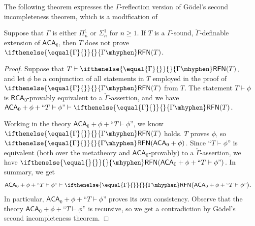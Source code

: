 \documentclass{mhkr}
\newcommand{\added}[1]{#1}
\newcommand{\RFN}[1][]{\ifthenelse{\equal{#1}{}}{}{#1\mhyphen}\mathsf{RFN}}
\newcommand{\RCA}{\mathsf{RCA}}
\newcommand{\ACA}{\mathsf{ACA}}
\begin{document}
\added{
The following theorem expresses the $\Gamma$-reflection version of G\"odel's second incompleteness theorem, which is a modification of \cite[Theorem 2.9]{TowsnerWalsh2024Classification}
\begin{proposition} \label{Proposition: Reflection version of second incompleteness}
    Suppose that $\Gamma$ is either $\Pi^1_n$ or $\Sigma^1_n$ for $n\ge 1$.
    If $T$ is a $\Gamma$-sound, $\check{\Gamma}$-definable extension of $\ACA_0$, then $T$ does not prove $\RFN[\Gamma](T)$.
\end{proposition}
\begin{proof}
    Suppose that $T\vdash \RFN[\Gamma](T)$, and let $\phi$ be a conjunction of all statements in $T$ employed in the proof of $\RFN[\Gamma](T)$ from $T$.
    The statement $T\vdash \phi$ is $\RCA_0$-provably equivalent to a $\check{\Gamma}$-assertion, and we have
    $\ACA_0+\phi+ \text{``} T\vdash \phi\text{''}\vdash \RFN[\Gamma](T)$.

    Working in the theory $\ACA_0 + \phi + \text{``} T\vdash \phi\text{''}$, we know $\RFN[\Gamma](T)$ holds. $T$ proves $\phi$, so $\RFN[\Gamma](\ACA_0+\phi)$. Since ``$T\vdash \phi$'' is equivalent (both over the metatheory and $\ACA_0$-provably) to a $\check{\Gamma}$-assertion, we have $\RFN(\ACA_0 + \phi + \text{``} T\vdash \phi\text{''})$.
    In summary, we get
    \begin{equation*}
        \ACA_0+ \phi + \text{``} T\vdash \phi\text{''}\vdash \RFN[\Gamma]\bigl(\ACA_0+\phi + \text{``} T\vdash \phi\text{''}\bigr).
    \end{equation*}
    In particular, $\ACA_0+\phi + \text{``} T\vdash \phi\text{''}$ proves its own consistency.
    Observe that the theory $\ACA_0+\phi + \text{``} T\vdash \phi\text{''}$ is recursive, so we get a contradiction by G\"odel's second incompleteness theorem.
\end{proof}
}
\end{document}
